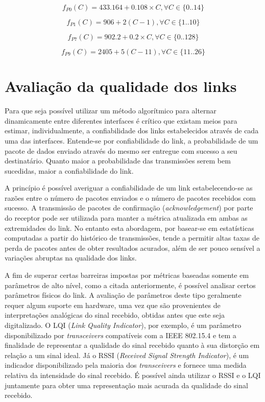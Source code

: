\documentclass{article}
\begin{document}
	\begin{equation}
		\label{eq:ch433msk}
		f_{P0}(C) = 433.164 + 0.108\times C, \forall C \in \{0..14\}
	\end{equation}
	
	\begin{equation}
		\label{eq:ch915ask}
		f_{P1}(C) = 906 + 2 (C - 1), \forall C \in \{1..10\}
	\end{equation}
	
	\begin{equation}
		\label{eq:ch915fsk}
		f_{P7}(C) = 902.2 + 0.2 \times C, \forall C \in \{0..128\}
	\end{equation}
		
	\begin{equation}
		\label{eq:ch2450oqpsk}
		f_{P9}(C) = 2405 + 5 (C - 11), \forall C \in \{11..26\}
	\end{equation}

\section{Avaliação da qualidade dos links}
	Para que seja possível utilizar um método algorítmico para alternar dinamicamente entre diferentes interfaces é crítico que existam meios para estimar, individualmente, a confiabilidade dos links estabelecidos através de cada uma das interfaces.  
	Entende-se por confiabilidade do link, a probabilidade de um pacote de dados enviado através do mesmo ser entregue com sucesso a seu destinatário. Quanto maior a probabilidade das transmissões serem bem sucedidas, maior a confiabilidade do link. 

	A princípio é possível averiguar a confiabilidade de um link estabelecendo-se as razões entre o número de pacotes enviados e o número de pacotes recebidos com sucesso. A transmissão de pacotes de confirmação (\textit{acknowledgement}) por parte do receptor pode ser utilizada para manter a métrica atualizada em ambas as extremidades do link. No entanto esta abordagem, por basear-se em estatísticas computadas a partir do histórico de transmissões, tende a permitir altas taxas de perda de pacotes antes de obter resultados acurados, além de ser pouco sensível a variações abruptas na qualidade dos links.
	
	A fim de superar certas barreiras impostas por métricas baseadas somente em parâmetros de alto nível, como a citada anteriormente, é possível analisar certos parâmetros físicos do link. A avaliação de parâmetros deste tipo geralmente requer algum suporte em hardware, uma vez que são provenientes de interpretações analógicas do sinal recebido, obtidas antes que este seja digitalizado. O LQI (\textit{Link Quality Indicator}), por exemplo, é um parâmetro disponibilizado por \textit{transceivers} compatíveis com a IEEE 802.15.4 e tem a finalidade de representar a qualidade do sinal recebido quanto à sua distorção em relação a um sinal ideal. Já o RSSI (\textit{Received Signal Strength Indicator}), é um indicador disponibilizado pela maioria dos \textit{transceivers} e fornece uma medida relativa da intensidade do sinal recebido. É possível ainda utilizar o RSSI e o LQI juntamente para obter uma representação mais acurada da qualidade do sinal recebido.
	
\end{document}
